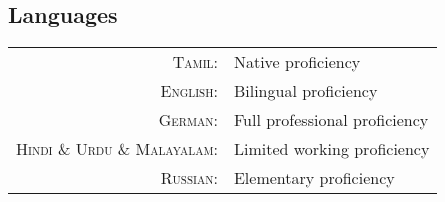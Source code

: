 \subsection{Languages} 
\begin{tabular}
	{rl} \textsc{Tamil:}&Native proficiency\\
	\textsc{English:}&Bilingual proficiency\\
	\textsc{German:}&Full professional proficiency\\
	\textsc{Hindi \& Urdu \& Malayalam:}&Limited working proficiency\\
	\textsc{Russian:}&Elementary proficiency\\
\end{tabular}
